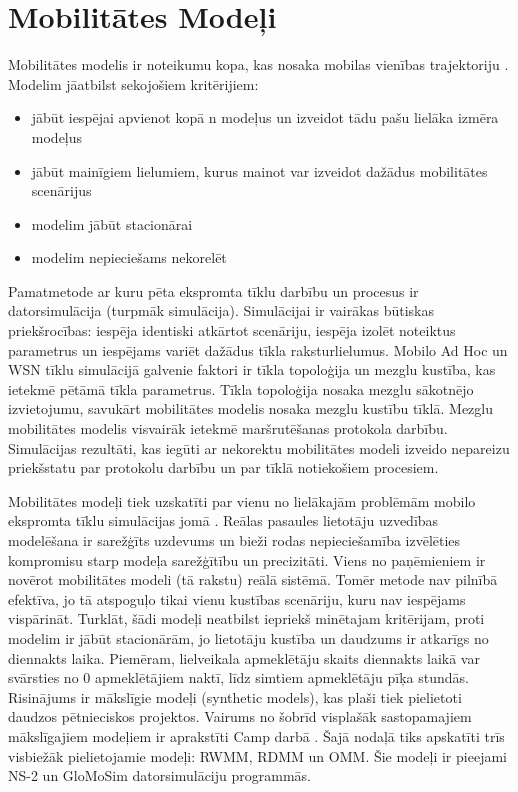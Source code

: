 \chapter{Mobilitātes Modeļi}\label{sec:mobilityModels}
Mobilitātes modelis ir noteikumu kopa, kas nosaka mobilas vienības trajektoriju \cite{tuduce}. Modelim jāatbilst sekojošiem  kritērijiem:
\begin{itemize}
\item jābūt iespējai apvienot kopā n modeļus un izveidot tādu pašu lielāka izmēra modeļus
\item jābūt mainīgiem lielumiem, kurus mainot var izveidot dažādus mobilitātes  scenārijus
\item modelim jābūt stacionārai
\item modelim nepieciešams nekorelēt
\end{itemize}

Pamatmetode ar kuru pēta ekspromta tīklu darbību un procesus ir datorsimulācija (turpmāk simulācija). Simulācijai ir vairākas būtiskas priekšrocības: iespēja identiski atkārtot scenāriju, iespēja izolēt noteiktus parametrus un iespējams variēt dažādus tīkla raksturlielumus. Mobilo Ad Hoc un WSN tīklu simulācijā galvenie faktori ir tīkla topoloģija un mezglu kustība, kas ietekmē pētāmā tīkla parametrus. Tīkla topoloģija nosaka mezglu sākotnējo izvietojumu, savukārt mobilitātes modelis nosaka mezglu kustību tīklā. Mezglu mobilitātes modelis visvairāk ietekmē maršrutēšanas protokola darbību. Simulācijas rezultāti, kas iegūti ar nekorektu mobilitātes modeli izveido nepareizu priekšstatu  par protokolu darbību un par tīklā notiekošiem procesiem.

Mobilitātes modeļi tiek uzskatīti par vienu no lielākajām problēmām mobilo ekspromta tīklu simulācijas jomā \cite{tuduce}. Reālas pasaules lietotāju uzvedības modelēšana ir sarežģīts uzdevums un bieži rodas nepieciešamība izvēlēties kompromisu starp modeļa sarežģītību un precizitāti. Viens no paņēmieniem ir novērot mobilitātes modeli (tā rakstu) reālā sistēmā. Tomēr metode nav pilnībā efektīva, jo tā atspoguļo tikai vienu kustības scenāriju, kuru nav iespējams vispārināt. Turklāt, šādi modeļi neatbilst iepriekš minētajam kritērijam, proti modelim ir jābūt stacionārām, jo lietotāju kustība un daudzums ir atkarīgs no diennakts laika. Piemēram, lielveikala apmeklētāju skaits diennakts laikā  var svārsties no 0 apmeklētājiem naktī, līdz simtiem apmeklētāju pīķa stundās. Risinājums ir mākslīgie modeļi (synthetic models), kas plaši tiek  pielietoti daudzos pētnieciskos projektos. Vairums no šobrīd visplašāk sastopamajiem mākslīgajiem modeļiem ir aprakstīti Camp darbā \cite{camp}. Šajā nodaļā tiks apskatīti trīs visbiežāk pielietojamie modeļi: \acf{RWMM}, \acf{RDMM} un \acf{OMM}. Šie modeļi ir pieejami \acl{NS-2} un GloMoSim datorsimulāciju programmās.

